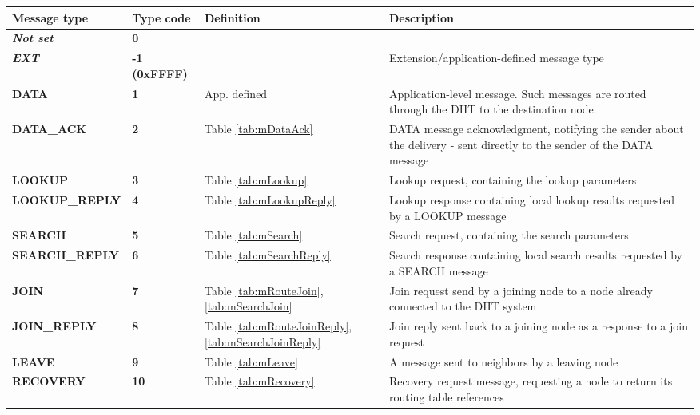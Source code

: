 \begin{table}[H]
\scriptsize
\begin{center}
\begin{tabular}{p{3cm} p{1.5cm} p{2cm} p{7.5cm}}
	\hline
	\textbf{Message type}					& \textbf{Type code}				& \textbf{Definition}						& \textbf{Description}				\\[1mm]
    \hline
    \textbf{\textit{Not set}}				& \textbf{0}						& 											& 				\\[1.5mm]
    \textbf{\textit{EXT}}					& \textbf{-1 (0xFFFF)}				& 											& Extension/application-defined message type				\\[1.5mm]
	\textbf{DATA}							& \textbf{1}						& App. defined								& Application-level message. Such messages are routed through the DHT to the destination node.		\\[1.5mm]
	\textbf{DATA\_ACK}						& \textbf{2}						& Table \ref{tab:mDataAck}					& DATA message acknowledgment, notifying the sender about the delivery - sent directly to the sender of the DATA message 			\\[1.5mm]
	\textbf{LOOKUP}							& \textbf{3}						& Table \ref{tab:mLookup}					& Lookup request, containing the lookup parameters				\\[1.5mm]
	\textbf{LOOKUP\_REPLY}					& \textbf{4}						& Table \ref{tab:mLookupReply}				& Lookup response containing local lookup results requested by a LOOKUP message			\\[1.5mm]
	\textbf{SEARCH}							& \textbf{5}						& Table \ref{tab:mSearch}					& Search request, containing the search parameters				\\[1.5mm]
	\textbf{SEARCH\_REPLY}					& \textbf{6}						& Table \ref{tab:mSearchReply}				& Search response containing local search results requested by a SEARCH message			\\[1.5mm]
	\textbf{JOIN}							& \textbf{7}						& Table \ref{tab:mRouteJoin}, \ref{tab:mSearchJoin}					& Join request send by a joining node to a node already connected to the DHT system			\\[1.5mm]
	\textbf{JOIN\_REPLY}					& \textbf{8}						& Table \ref{tab:mRouteJoinReply}, \ref{tab:mSearchJoinReply}		& Join reply sent back to a joining node as a response to a join request				\\[1.5mm]
	\textbf{LEAVE}							& \textbf{9}						& Table \ref{tab:mLeave}					& A message sent to neighbors by a leaving node					\\[1.5mm]
	\textbf{RECOVERY}						& \textbf{10}						& Table \ref{tab:mRecovery}					& Recovery request message, requesting a node to return its routing table references	\\[1.5mm]

\end{tabular}
\end{center}
\end{table}
